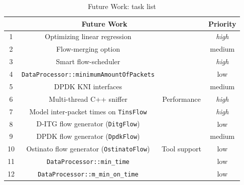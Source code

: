 \begin{table}[ht!]
	\centering
	\caption{Future Work: task list}
	\label{tab:task-list}
	\begin{tabular}{cccc}
		\hline
		\multicolumn{3}{c}{Future Work}	& Priority \\ \hline
		1                      & Optimizing linear regression                              &                                                 & \textit{high}                    \\
		2                      & Flow-merging option                                       &                                                 & medium                  \\
		3                      & Smart flow-scheduler                                      &                                                 & \textit{high}                    \\
		4                      & \texttt{DataProcessor::minimumAmountOfPackets}                         &                                                 & low                     \\
		5                      & DPDK KNI interfaces                                       &                                                 & medium                     \\
		6                      & Multi-thread C++ sniffer                                  & \multirow{-6}{*}{Performance}                   & \textit{high}                    \\ \hline
		7                      & Model inter-packet times on \texttt{TinsFlow}           &                                                 & \textit{high}                    \\
		8                      & D-ITG flow generator (\texttt{DitgFlow})                &                                                 & low                     \\
		9                      & DPDK flow generator (\texttt{DpdkFlow})                 &                                                 & medium                     \\
		10                     & Ostinato flow generator (\texttt{OstinatoFlow})         & \multirow{-4}{*}{Tool support}                  & low                     \\ \hline
		11                     & \texttt{DataProcessor::min\_time}                       &                                                 & low                     \\
		12                     & \texttt{DataProcessor::m\_min\_on\_time}                &                                                 & low                     \\

\end{tabular}
\end{table}
